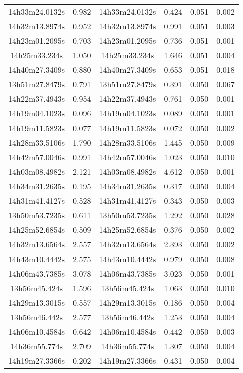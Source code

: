 \begin{table}
\begin{tabular}{cccccc}
14h33m24.0132s & 0.982 & 14h33m24.0132s & 0.424 & 0.051 & 0.002 \\
14h32m13.8974s & 0.952 & 14h32m13.8974s & 0.991 & 0.051 & 0.003 \\
14h23m01.2095s & 0.703 & 14h23m01.2095s & 0.736 & 0.051 & 0.001 \\
14h25m33.234s & 1.050 & 14h25m33.234s & 1.646 & 0.051 & 0.004 \\
14h40m27.3409s & 0.880 & 14h40m27.3409s & 0.653 & 0.051 & 0.018 \\
13h51m27.8479s & 0.791 & 13h51m27.8479s & 0.391 & 0.050 & 0.067 \\
14h22m37.4943s & 0.954 & 14h22m37.4943s & 0.761 & 0.050 & 0.001 \\
14h19m04.1023s & 0.096 & 14h19m04.1023s & 0.089 & 0.050 & 0.001 \\
14h19m11.5823s & 0.077 & 14h19m11.5823s & 0.072 & 0.050 & 0.002 \\
14h28m33.5106s & 1.790 & 14h28m33.5106s & 1.445 & 0.050 & 0.009 \\
14h42m57.0046s & 0.991 & 14h42m57.0046s & 1.023 & 0.050 & 0.010 \\
14h03m08.4982s & 2.121 & 14h03m08.4982s & 4.612 & 0.050 & 0.001 \\
14h34m31.2635s & 0.195 & 14h34m31.2635s & 0.317 & 0.050 & 0.004 \\
14h31m41.4127s & 0.528 & 14h31m41.4127s & 0.343 & 0.050 & 0.003 \\
13h50m53.7235s & 0.611 & 13h50m53.7235s & 1.292 & 0.050 & 0.028 \\
14h25m52.6854s & 0.509 & 14h25m52.6854s & 0.376 & 0.050 & 0.002 \\
14h32m13.6564s & 2.557 & 14h32m13.6564s & 2.393 & 0.050 & 0.002 \\
14h43m10.4442s & 2.575 & 14h43m10.4442s & 0.979 & 0.050 & 0.008 \\
14h06m43.7385s & 3.078 & 14h06m43.7385s & 3.023 & 0.050 & 0.001 \\
13h56m45.424s & 1.596 & 13h56m45.424s & 1.063 & 0.050 & 0.010 \\
14h29m13.3015s & 0.557 & 14h29m13.3015s & 0.186 & 0.050 & 0.004 \\
13h56m46.442s & 2.577 & 13h56m46.442s & 1.253 & 0.050 & 0.004 \\
14h06m10.4584s & 0.642 & 14h06m10.4584s & 0.442 & 0.050 & 0.003 \\
14h36m55.774s & 2.709 & 14h36m55.774s & 1.307 & 0.050 & 0.004 \\
14h19m27.3366s & 0.202 & 14h19m27.3366s & 0.431 & 0.050 & 0.004 \\

\end{tabular}
\end{table}
